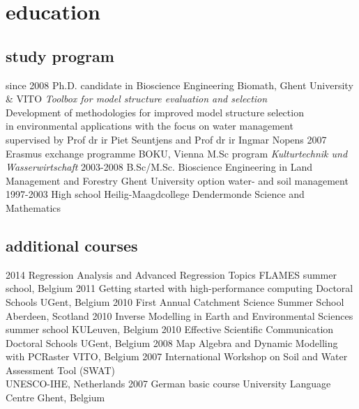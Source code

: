 \documentclass[]{friggeri-cv}  %
\begin{document}
\section{education}
\subsection*{study program}
\begin{entrylist}
  \entry
    {since 2008}
    {Ph.D. {\normalfont candidate in Bioscience Engineering}}
    {Biomath, Ghent University \& VITO}
    {\emph{Toolbox for model structure evaluation and selection}\\
    Development of methodologies for improved model structure selection\\ in environmental applications with the focus on water management\\ \small{supervised by Prof dr ir Piet Seuntjens and Prof dr ir Ingmar Nopens}}
  \entry
    {2007}
    {Erasmus exchange programme}
    {BOKU, Vienna}
    {M.Sc program \textit{Kulturtechnik und Wasserwirtschaft}}
  \entry
    {2003-2008}
    {B.Sc/M.Sc. Bioscience Engineering in Land Management and Forestry}
    {Ghent University}
    {option water- and soil management}
  \entry
    {1997-2003}
    {High school}
    {Heilig-Maagdcollege Dendermonde}
    {Science and Mathematics}
\end{entrylist}

\subsection*{additional courses}
\begin{entrylist}
  \shortentry
    {2014}
    {Regression Analysis and Advanced Regression Topics}
    {FLAMES summer school, Belgium}
  \shortentry
    {2011}
    {Getting started with high-performance computing}
    {Doctoral Schools UGent, Belgium}
  \shortentry
    {2010}
    {First Annual Catchment Science Summer School}
    {Aberdeen, Scotland}
  \shortentry
    {2010}
    {Inverse Modelling in Earth and Environmental Sciences}
    {summer school KULeuven, Belgium}
  \shortentry
    {2010}
    {Effective Scientific Communication}
    {Doctoral Schools UGent, Belgium}
  \shortentry
    {2008}
    {Map Algebra and Dynamic Modelling with PCRaster}
    {VITO, Belgium}
  \shortentry
    {2007}
    {International Workshop on Soil and Water Assessment Tool (SWAT)\\ }
    {UNESCO-IHE, Netherlands}
  \shortentry
    {2007}
    {German basic course}
    {University Language Centre Ghent, Belgium}
\end{entrylist}
\end{document}
